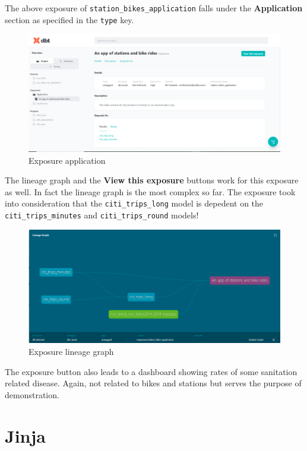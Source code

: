 \documentclass[
]{book}
\begin{document}
The above exposure of \texttt{station\_bikes\_application} falls under the \textbf{Application} section as specified in the \texttt{type} key.

\begin{figure}
\centering
\includegraphics{./images/exposure_application.png}
\caption{Exposure application}
\end{figure}

The lineage graph and the \textbf{View this exposure} buttons work for this exposure as well. In fact the lineage graph is the most complex so far. The exposure took into consideration that the \texttt{citi\_trips\_long} model is depedent on the \texttt{citi\_trips\_minutes} and \texttt{citi\_trips\_round} models!

\begin{figure}
\centering
\includegraphics{./images/exposure_lineage_graph2.png}
\caption{Exposure lineage graph}
\end{figure}

The exposure button also leads to a dashboard showing rates of some sanitation related disease. Again, not related to bikes and stations but serves the purpose of demonstration.

\hypertarget{jinja}{%
\chapter{Jinja}\label{jinja}}
\end{document}
